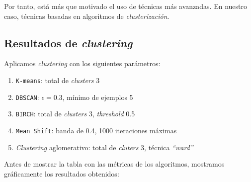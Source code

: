 \documentclass[11pt]{article}
\newcommand{\entrecomillado}[1]{\emph{``#1''}}
\begin{document}
Por tanto, está más que motivado el uso de técnicas más avanzadas. En nuestro caso, técnicas basadas en algoritmos de \emph{clusterización}.

\pagebreak

\subsection{Resultados de \emph{clustering}} \label{stcase01_parametros:seccion}

Aplicamos \emph{clustering} con los siguientes parámetros:

\begin{enumerate}
    \item \lstinline{K-means}: total de \emph{clusters} 3
    \item \lstinline{DBSCAN}: $\epsilon = 0.3$, mínimo de ejemplos 5
    \item \lstinline{BIRCH}: total de \emph{clusters} 3, \emph{threshold} 0.5
    \item \lstinline{Mean Shift}: banda de 0.4, 1000 iteraciones máximas
    \item \emph{Clustering} aglomerativo: total de \emph{cluters} 3, técnica \entrecomillado{ward}
\end{enumerate}

Antes de mostrar la tabla con las métricas de los algoritmos, mostramos gráficamente los resultados obtenidos:
\end{document}
